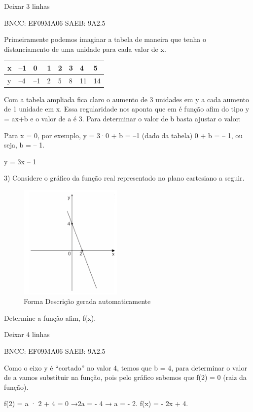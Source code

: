 \begin{escolha}
{{{\begin{escolha}
{Deixar 3 linhas

BNCC: EF09MA06 SAEB: 9A2.5

Primeiramente podemos imaginar a tabela de maneira que tenha o
distanciamento de uma unidade para cada valor de x.

\begin{longtable}[]{@{}llllllll@{}}
\toprule\noalign{}
x & --1 & 0 & 1 & 2 & 3 & 4 & 5 \\
\midrule\noalign{}
\endhead
\bottomrule\noalign{}
\endlastfoot
y & --4 & --1 & 2 & 5 & 8 & 11 & 14 \\
\end{longtable}

Com a tabela ampliada fica claro o aumento de 3 unidades em y a cada
aumento de 1 unidade em x. Essa regularidade nos aponta que em é função
afim do tipo y = ax+b e o valor de a é 3. Para determinar o valor de b
basta ajustar o valor:

Para x = 0, por exemplo, y = 3·0 + b = --1 (dado da tabela) 0 + b = --
1, ou seja, b = -- 1.

y = 3x -- 1

3) Considere o gráfico da função real representado no plano cartesiano a
seguir.

\begin{figure}
\centering
\includegraphics[width=1.97543in,height=2.20513in]{./_SAEB_9_MAT/media/image137.png}
\caption{Forma Descrição gerada automaticamente}
\end{figure}

Determine a função afim, f(x).

Deixar 4 linhas

BNCC: EF09MA06 SAEB: 9A2.5

Como o eixo y é ``cortado'' no valor 4, temos que b = 4, para determinar
o valor de a vamos substituir na função, pois pelo gráfico sabemos que
f(2) = 0 (raiz da função).

f(2) = a · 2 + 4 = 0 →2a = - 4 → a = - 2. f(x) = - 2x + 4.

}
\end{escolha}}}}
\end{escolha}
